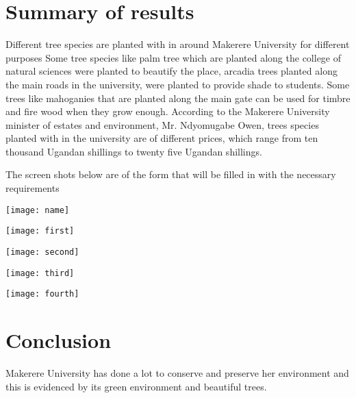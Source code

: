 \documentclass{article}
\begin{document}
\section{Summary of results}
Different tree species are planted with in around Makerere University for different purposes
  Some tree species like palm tree which are planted along the college of natural sciences were planted to beautify the place, arcadia trees planted along the main roads in the university, were planted to provide shade to students.
Some trees like mahoganies that are planted along the main gate can be used for timbre and fire wood when they grow enough.
According to the Makerere University minister of estates and environment, Mr. Ndyomugabe Owen, trees species planted with in the university are of different prices, which range from ten thousand Ugandan shillings to twenty five Ugandan shillings.

The screen shots below are of the form that will be filled in with the necessary requirements
\graphicspath{ {images/} }

\texttt{[image: name]}
\graphicspath{ {images/} }

\texttt{[image: first]}

\graphicspath{ {images/} }

\texttt{[image: second]}

\graphicspath{ {images/} }

\texttt{[image: third]}
\graphicspath{ {images/} }

\texttt{[image: fourth]}

\section{Conclusion}
  Makerere University has done a lot to conserve and preserve her environment and this is evidenced by its green environment and beautiful trees.
\end{document}

